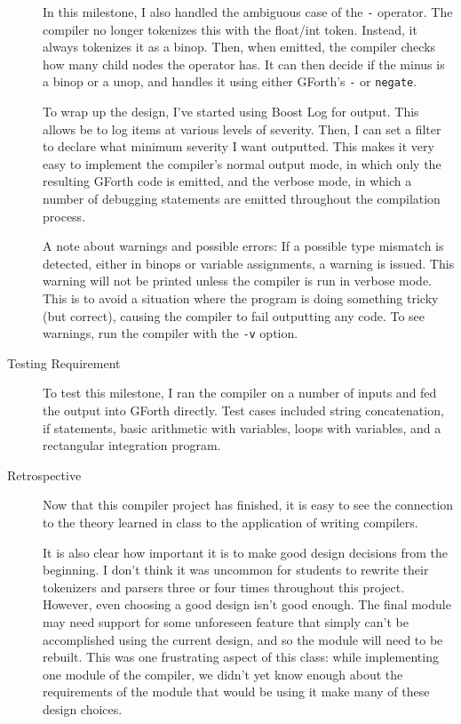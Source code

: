 \documentclass[12pt,letterpaper]{article}
\begin{document}
\begin{description}
  In this milestone, I also handled the ambiguous case of the \texttt{-}
  operator. The compiler no longer tokenizes this with the float/int token.
  Instead, it always tokenizes it as a binop. Then, when emitted, the compiler
  checks how many child nodes the operator has. It can then decide if the minus
  is a binop or a unop, and handles it using either GForth's \texttt{-} or
  \texttt{negate}.

  To wrap up the design, I've started using Boost Log for output. This allows be
  to log items at various levels of severity. Then, I can set a filter to
  declare what minimum severity I want outputted. This makes it very easy to
  implement the compiler's normal output mode, in which only the resulting
  GForth code is emitted, and the verbose mode, in which a number of debugging
  statements are emitted throughout the compilation process.

  A note about warnings and possible errors: If a possible type mismatch is
  detected, either in binops or variable assignments, a warning is issued. This
  warning will not be printed unless the compiler is run in verbose mode. This
  is to avoid a situation where the program is doing something tricky (but
  correct), causing the compiler to fail outputting any code. To see warnings,
  run the compiler with the \texttt{-v} option.
  
\item[Testing Requirement] To test this milestone, I ran the compiler on a
  number of inputs and fed the output into GForth directly. Test cases included
  string concatenation, if statements, basic arithmetic with variables, loops
  with variables, and a rectangular integration program.

  
\item[Retrospective] Now that this compiler project has finished, it is easy to
  see the connection to the theory learned in class to the application of
  writing compilers.

  It is also clear how important it is to make good design decisions from the
  beginning. I don't think it was uncommon for students to rewrite their
  tokenizers and parsers three or four times throughout this project. However,
  even choosing a good design isn't good enough. The final module may need
  support for some unforeseen feature that simply can't be accomplished using
  the current design, and so the module will need to be rebuilt. This was one
  frustrating aspect of this class: while implementing one module of the
  compiler, we didn't yet know enough about the requirements of the module that
  would be using it make many of these design choices.
\end{description}
\end{document}
